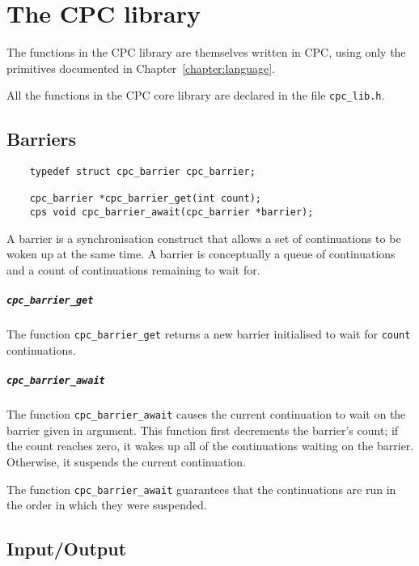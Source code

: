 \documentclass[a4paper]{report}
\begin{document}
\chapter{The CPC library}

The functions in the CPC library are themselves written in CPC, using
only the primitives documented in Chapter~\ref{chapter:language}.

All the functions in the CPC core library are declared in the file
{\tt cpc\_lib.h}.

\section{Barriers}

\begin{verbatim}
    typedef struct cpc_barrier cpc_barrier;

    cpc_barrier *cpc_barrier_get(int count);
    cps void cpc_barrier_await(cpc_barrier *barrier);
\end{verbatim}

A barrier is a synchronisation construct that allows a set of
continuations to be woken up at the same time.  A barrier is
conceptually a queue of continuations and a count of continuations
remaining to wait for.

\paragraph{\tt cpc\_barrier\_get} The function {\tt cpc\_barrier\_get}
returns a new barrier initialised to wait for {\tt count}
continuations.

\paragraph{\tt cpc\_barrier\_await} The function {\tt cpc\_barrier\_await}
causes the current continuation to wait on the barrier given in
argument.  This function first decrements the barrier's count; if the
count reaches zero, it wakes up all of the continuations waiting on
the barrier.  Otherwise, it suspends the current continuation.

The function {\tt cpc\_barrier\_await} guarantees that the
continuations are run in the order in which they were suspended.

\section{Input/Output}
\end{document}
